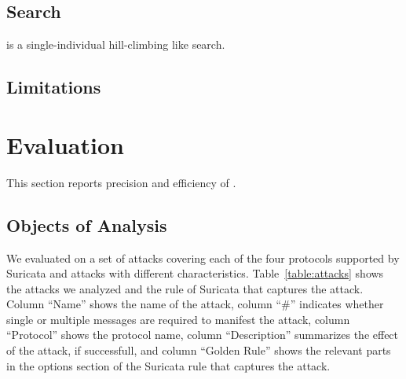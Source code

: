 \documentclass[conference]{IEEEtran}
\begin{document}
\subsection{Search}

\tname{} is a single-individual hill-climbing like search.


\subsection{Limitations}


\section{Evaluation}



This section reports precision and efficiency of \tname.


\subsection{Objects of Analysis}

We evaluated \tname{} on a set of attacks covering each of the four
protocols supported by Suricata and attacks with different
characteristics. Table~\ref{table:attacks} shows the attacks we
analyzed and the rule of Suricata that captures the attack. Column
``Name'' shows the name of the attack, column ``\#'' indicates whether
single or multiple messages are required to manifest the attack,
column ``Protocol'' shows the protocol name, column ``Description''
summarizes the effect of the attack, if successfull, and column
``Golden Rule'' shows the relevant parts in the options section of the
Suricata rule that captures the attack.
\end{document}
